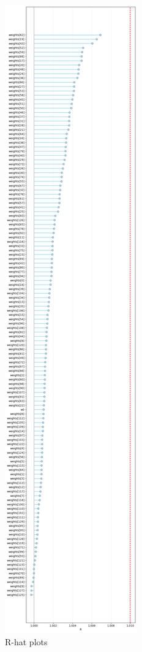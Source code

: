 \documentclass[letter]{article}
\begin{document}
\begin{figure}[H]
    \centering
    \includegraphics[scale=0.25]{appendix/rhat.png}
    \caption{R-hat plots}
    \label{fig:rhat_plot}
\end{figure} 
\end{document}
